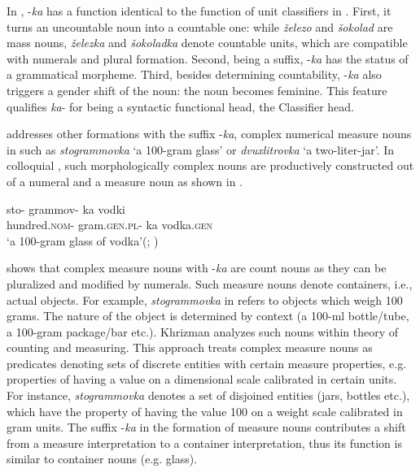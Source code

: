\documentclass[output=paper]{langscibook}
\begin{document}
\noindent In , -\textit{ka} has a function identical to the function of unit classifiers in . First,  it turns an uncountable noun into a countable one: while \textit{železo} and \textit{šokolad} are mass nouns, \textit{železka} and \textit{šokoladka} denote countable units, which are compatible with numerals and plural formation. Second, being a suffix, -\textit{ka} has the status of a grammatical morpheme. Third, besides determining countability, -\textit{ka} also triggers a gender shift of the noun: the noun becomes feminine. This feature qualifies \textit{ka}- for being a syntactic functional head, the Classifier head.\largerpage

 addresses other formations with the suffix -\textit{ka}, complex numerical measure nouns in  such as \textit{stogrammovka} `a 100-gram glass' or \textit{dvuxlitrovka} `a two-liter-jar'. In colloquial , such morphologically complex nouns are productively constructed out of a numeral and a measure noun as shown in .

\ea \label{ex:19}
\gll sto- 	grammov- 	ka 		vodki\\
  hundred.\textsc{nom}-	gram.\textsc{gen.pl}-	ka 					vodka.\textsc{gen} \\
\glt `a 100-gram glass of vodka'\hfill (; )
\z

\noindent \citeauthor{chapters/khrizman} shows that complex measure nouns with -\textit{ka} are count nouns as they can be pluralized and modified by numerals. Such measure nouns denote containers, i.e., actual objects. For example, \textit{stogrammovka} in  refers to objects which weigh 100 grams. The nature of the object is determined by context (a 100-ml bottle/tube, a 100-gram package/bar etc.). Khrizman analyzes such nouns within  theory of counting and measuring. This approach treats complex measure nouns as predicates denoting sets of discrete entities with certain measure properties, e.g. properties of having a value on a dimensional scale calibrated in certain units. For instance, \textit{stogrammovka} denotes a set of disjoined entities (jars, bottles etc.), which have the property of having the value 100 on a weight scale calibrated in gram units. The suffix -\textit{ka} in the formation of measure nouns contributes a shift from a measure interpretation to a container interpretation, thus its function is similar to container nouns (e.g. glass).
\end{document}
